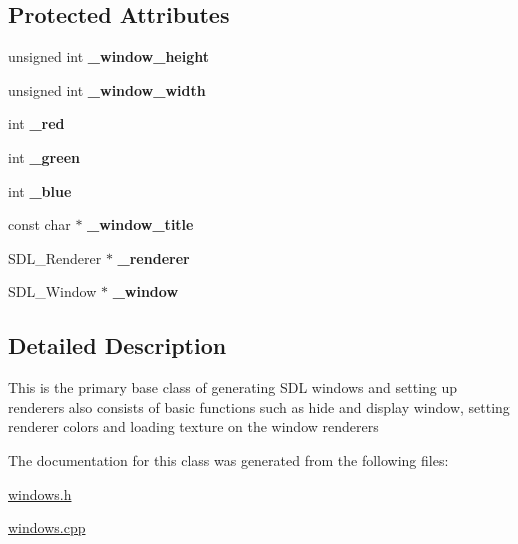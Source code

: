 \subsection*{Protected Attributes}
\begin{DoxyCompactItemize}
\item 
\hypertarget{class_s_d_l_window_acc157932676ffcb867e6a310d0dbf69b}{}\label{class_s_d_l_window_acc157932676ffcb867e6a310d0dbf69b} 
unsigned int {\bfseries \+\_\+window\+\_\+height}
\item 
\hypertarget{class_s_d_l_window_acd0639d5ba847c6fdffa9670678e0b4f}{}\label{class_s_d_l_window_acd0639d5ba847c6fdffa9670678e0b4f} 
unsigned int {\bfseries \+\_\+window\+\_\+width}
\item 
\hypertarget{class_s_d_l_window_a56b01157b3545f359a0beff63d5d404c}{}\label{class_s_d_l_window_a56b01157b3545f359a0beff63d5d404c} 
int {\bfseries \+\_\+red}
\item 
\hypertarget{class_s_d_l_window_a8290094b34e41442814cdde78f8be0d8}{}\label{class_s_d_l_window_a8290094b34e41442814cdde78f8be0d8} 
int {\bfseries \+\_\+green}
\item 
\hypertarget{class_s_d_l_window_a137c54559f64208948d607d915e3b3ef}{}\label{class_s_d_l_window_a137c54559f64208948d607d915e3b3ef} 
int {\bfseries \+\_\+blue}
\item 
\hypertarget{class_s_d_l_window_ad56f59226f814417588bd183b3d95ec7}{}\label{class_s_d_l_window_ad56f59226f814417588bd183b3d95ec7} 
const char $\ast$ {\bfseries \+\_\+window\+\_\+title}
\item 
\hypertarget{class_s_d_l_window_a5d019d10d5b118d1436601d28648395a}{}\label{class_s_d_l_window_a5d019d10d5b118d1436601d28648395a} 
S\+D\+L\+\_\+\+Renderer $\ast$ {\bfseries \+\_\+renderer}
\item 
\hypertarget{class_s_d_l_window_a9837fbcefc8e6fc41b11d44964c79cf2}{}\label{class_s_d_l_window_a9837fbcefc8e6fc41b11d44964c79cf2} 
S\+D\+L\+\_\+\+Window $\ast$ {\bfseries \+\_\+window}
\end{DoxyCompactItemize}


\subsection{Detailed Description}
This is the primary base class of generating S\+DL windows and setting up renderers also consists of basic functions such as hide and display window, setting renderer colors and loading texture on the window renderers 

The documentation for this class was generated from the following files\+:\begin{DoxyCompactItemize}
\item 
\hyperlink{windows_8h}{windows.\+h}\item 
\hyperlink{windows_8cpp}{windows.\+cpp}\end{DoxyCompactItemize}
